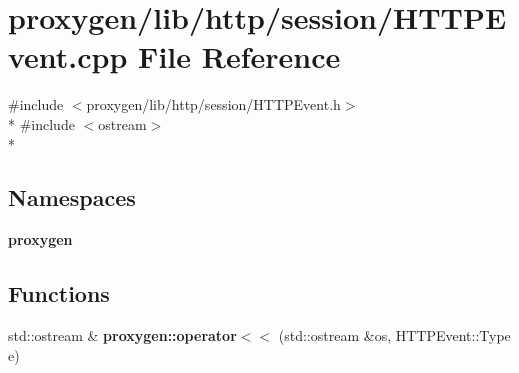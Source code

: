 \section{proxygen/lib/http/session/\+H\+T\+T\+P\+Event.cpp File Reference}
\label{HTTPEvent_8cpp}
{\ttfamily \#include $<$proxygen/lib/http/session/\+H\+T\+T\+P\+Event.\+h$>$}\\*
{\ttfamily \#include $<$ostream$>$}\\*
\subsection*{Namespaces}
\begin{DoxyCompactItemize}
\item 
 {\bf proxygen}
\end{DoxyCompactItemize}
\subsection*{Functions}
\begin{DoxyCompactItemize}
\item 
std\+::ostream \& {\bf proxygen\+::operator$<$$<$} (std\+::ostream \&os, H\+T\+T\+P\+Event\+::\+Type e)
\end{DoxyCompactItemize}
